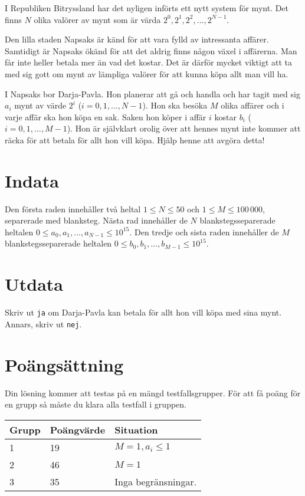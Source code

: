 I Republiken Bitryssland har det nyligen införts ett nytt system för mynt.
Det finns $N$ olika valörer av mynt som är värda $2^0, 2^1, 2^2, ..., 2^{N-1}$. 

Den lilla staden Napsaks är känd för att vara fylld av intressanta affärer.
Samtidigt är Napsaks ökänd för att det aldrig finns någon växel i affärerna.
Man får inte heller betala mer än vad det kostar.
Det är därför mycket viktigt att ta med sig gott om mynt av lämpliga valörer för att kunna köpa allt man vill ha. 

I Napsaks bor Darja-Pavla.
Hon planerar att gå och handla och har tagit med sig $a_i$ mynt av värde $2^i$ ($i = 0, 1, ..., N-1$).
Hon ska besöka $M$ olika affärer och i varje affär ska hon köpa en sak.
Saken hon köper i affär $i$ kostar $b_i$ ($i = 0, 1, ..., M-1$).
Hon är självklart orolig över att hennes mynt inte kommer att räcka för att betala för allt hon vill köpa. Hjälp henne att avgöra detta!

\section*{Indata}
Den första raden innehåller två heltal $1 \le N \le 50$ och $1 \le M \le 100\,000$, separerade med blanksteg.
Nästa rad innehåller de $N$ blankstegsseparerade heltalen $0 \le a_0, a_1, ..., a_{N-1} \le 10^{15}$.
Den tredje och sista raden innehåller de $M$ blankstegsseparerade heltalen $0 \le b_0, b_1, ..., b_{M-1} \le 10^{15}$.

\section*{Utdata}
Skriv ut \texttt{ja} om Darja-Pavla kan betala för allt hon vill köpa med sina mynt.
Annars, skriv ut \texttt{nej}.

\section*{Poängsättning}
Din lösning kommer att testas på en mängd testfallsgrupper. För att få poäng för en grupp
så måste du klara alla testfall i gruppen.

\noindent
\begin{tabular}{| l | l | l |}
\hline
Grupp & Poängvärde & Situation \\ \hline
1     & 19         & $M = 1, a_i \le 1$ \\ \hline
2     & 46         & $M = 1$ \\ \hline
3     & 35         & Inga begränsningar. \\ \hline
\end{tabular}

